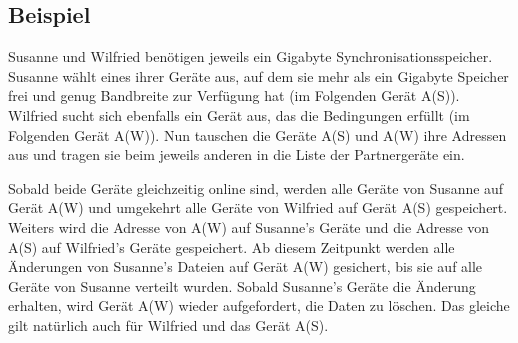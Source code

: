 \subsection{Beispiel}
Susanne und Wilfried benötigen jeweils ein Gigabyte Synchronisationsspeicher. Susanne wählt eines ihrer Geräte aus, auf dem sie mehr als ein Gigabyte Speicher frei und genug Bandbreite zur Verfügung hat (im Folgenden Gerät A(S)). Wilfried sucht sich ebenfalls ein Gerät aus, das die Bedingungen erfüllt (im Folgenden Gerät A(W)). Nun tauschen die Geräte A(S) und A(W) ihre Adressen aus und tragen sie beim jeweils anderen in die Liste der Partnergeräte ein. 

Sobald beide Geräte gleichzeitig online sind, werden alle Geräte von Susanne auf Gerät A(W) und umgekehrt alle Geräte von Wilfried auf Gerät A(S) gespeichert. Weiters wird die Adresse von A(W) auf Susanne's Geräte und die Adresse von A(S) auf Wilfried's Geräte gespeichert. Ab diesem Zeitpunkt werden alle Änderungen von Susanne's Dateien auf Gerät A(W) gesichert, bis sie auf alle Geräte von Susanne verteilt wurden. Sobald Susanne's Geräte die Änderung erhalten, wird Gerät A(W) wieder aufgefordert, die Daten zu löschen. Das gleiche gilt natürlich auch für Wilfried und das Gerät A(S). 